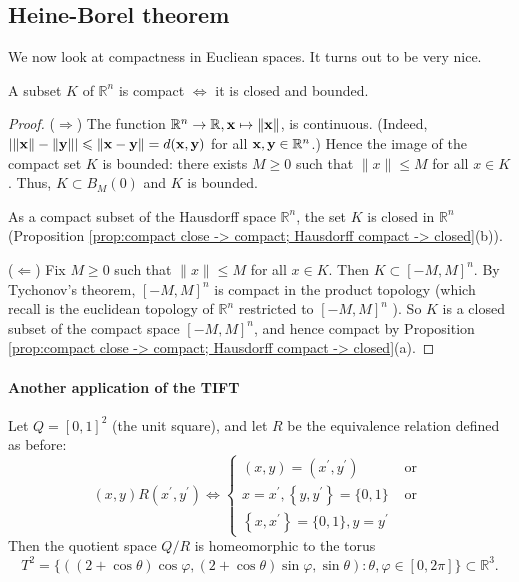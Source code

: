 \documentclass[a4paper]{article}
\begin{document}
\subsection{Heine-Borel theorem}
We now look at compactness in Eucliean spaces. It turns out to be very nice.
\begin{theorem}\label{thm:Heine-Borel}
    A subset $K$ of $\mathbb{R}^{n}$ is compact $\Longleftrightarrow$ it is closed and bounded.
\end{theorem}
\begin{proof}
    ($ \Longrightarrow $) The function $\mathbb{R}^{n} \rightarrow \mathbb{R}, {\bf x} \mapsto\|{\bf x}\|$, is continuous. (Indeed, $|\|{\bf x}\|-\|{\bf y}\|| \leqslant\|{\bf x}-{\bf y}\|=d({\bf x}, {\bf y})$ for all ${\bf x}, {\bf y} \in \mathbb{R}^{n}$.) Hence the image of the compact set $K$ is bounded: there exists $M \geqslant 0$ such that $\|x\| \leqslant M$ for all $x \in K$. Thus, $K \subset B_{M}(0)$ and $K$ is bounded.

    As a compact subset of the Hausdorff space $\mathbb{R}^{n}$, the set $K$ is closed in $\mathbb{R}^{n}$ (Proposition \ref{prop:compact close -> compact; Hausdorff compact -> closed}(b)).

    ($ \Longleftarrow$) Fix $M \geqslant 0$ such that $\|x\| \leqslant M$ for all $x \in K$. Then $K \subset[-M, M]^{n}$. By Tychonov's theorem, $[-M, M]^{n}$ is compact in the product topology (which recall is the euclidean topology of $\mathbb{R}^{n}$ restricted to $[-M, M]^{n}$ ). So $K$ is a closed subset of the compact space $[-M, M]^{n}$, and hence compact by Proposition \ref{prop:compact close -> compact; Hausdorff compact -> closed}(a).
\end{proof}

\paragraph*{Another application of the TIFT} Let $Q=[0,1]^{2}$ (the unit square), and let $R$ be the equivalence relation defined as before: 
$$
(x, y) R\left(x^{\prime}, y^{\prime}\right) \Longleftrightarrow \begin{cases}(x, y)=\left(x^{\prime}, y^{\prime}\right) & \text { or } \\ x=x^{\prime},\left\{y, y^{\prime}\right\}=\{0,1\} & \text { or } \\ \left\{x, x^{\prime}\right\}=\{0,1\}, y=y^{\prime} & \end{cases}
$$
Then the quotient space $Q / R$ is homeomorphic to the torus
$$
T^{2}=\{((2+\cos \theta) \cos \varphi,(2+\cos \theta) \sin \varphi, \sin \theta): \theta, \varphi \in[0,2 \pi]\} \subset \mathbb{R}^{3}.
$$
\end{document}
